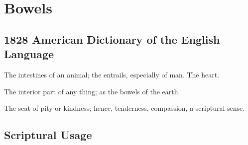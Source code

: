 \section{Bowels}
	\label{BOWELS}
	

\subsection{1828 American Dictionary of the English Language} %
	\label{BOWELS-1828}

	\begin{compactitem}
		\item[1] The intestines of an animal; the entrails, especially of man. The heart.
		\item[2] The interior part of any thing; as the bowels of the earth.
		\item[3] The seat of pity or kindness; hence, tenderness, compassion, a scriptural sense.
	\end{compactitem}



\subsection{Scriptural Usage} %
	\label{BOWELS-SCRIPTURES}

	
